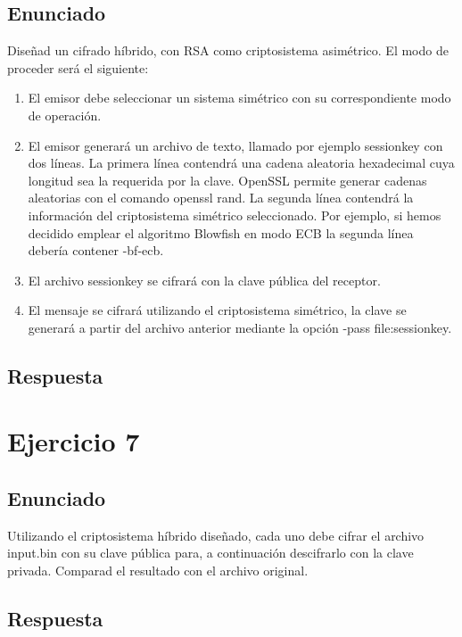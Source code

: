 \documentclass[10pt,a4paper,spanish]{report}
\begin{document}
\section{Enunciado}
\noindent
Diseñad un cifrado híbrido, con RSA como criptosistema asimétrico. El modo de proceder será el siguiente:
\begin{enumerate}
 \item El emisor debe seleccionar un sistema simétrico con su correspondiente modo de operación.
 \item El emisor generará un archivo de texto, llamado por ejemplo sessionkey con dos líneas. La primera línea contendrá una cadena aleatoria hexadecimal cuya longitud sea la requerida por la clave. OpenSSL permite generar cadenas aleatorias con el comando openssl rand. La segunda línea contendrá la información del criptosistema simétrico seleccionado. Por ejemplo, si hemos decidido emplear el algoritmo Blowfish en modo ECB la segunda línea debería contener -bf-ecb.
 \item El archivo sessionkey se cifrará con la clave pública del receptor.
 \item El mensaje se cifrará utilizando el criptosistema simétrico, la clave se generará a partir del archivo anterior mediante la opción -pass file:sessionkey.
\end{enumerate}

\section{Respuesta}
\noindent

\chapter{Ejercicio 7}

\section{Enunciado}
\noindent
Utilizando el criptosistema híbrido diseñado, cada uno debe cifrar el archivo input.bin con su clave pública para, a continuación descifrarlo con la clave privada. Comparad el resultado con el archivo original.

\section{Respuesta}
\noindent
\end{document}
